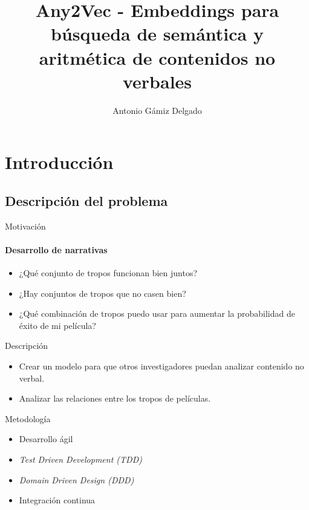 \documentclass{beamer}
\title[Any2Vec - Embeddings para búsqueda de semántica y aritmética de contenidos no verbales]{Any2Vec - Embeddings para búsqueda de semántica y aritmética de contenidos no verbales}
\author[A. Gámiz]{Antonio Gámiz Delgado}
\begin{document}
	\typesetFrontSlides


\section{Introducción}

\subsection[Problema]{Descripción del problema}

\begin{frame}{Motivación}
  \framesubtitle{Desarrollo de narrativas}
	\begin{itemize}
    \item ¿Qué conjunto de tropos funcionan bien juntos?
    \item ¿Hay conjuntos de tropos que no casen bien?
    \item ¿Qué combinación de tropos puedo usar para aumentar la probabilidad de éxito de mi película?
  \end{itemize}
\end{frame}

\begin{frame}{Descripción}
  \begin{itemize}
    \item Crear un modelo para que otros investigadores puedan analizar contenido no verbal.
    \item Analizar las relaciones entre los tropos de películas.
  \end{itemize}
\end{frame}

\begin{frame}{Metodología}
	\begin{itemize}
		\item Desarrollo ágil
		\item \textit{Test Driven Development (TDD)}
		\item \textit{Domain Driven Design (DDD)}
		\item Integración continua
	\end{itemize}
\end{frame}
\end{document}
